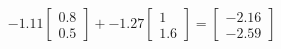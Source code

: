 \documentclass[preview]{standalone}
\begin{document}
\begin{align*}
-1.11 \begin{bmatrix} 0.8 \\ 0.5 \end{bmatrix} + -1.27 \begin{bmatrix} 1 \\ 1.6 \end{bmatrix} = \begin{bmatrix} -2.16 \\ -2.59 \end{bmatrix}
\end{align*}
\end{document}
